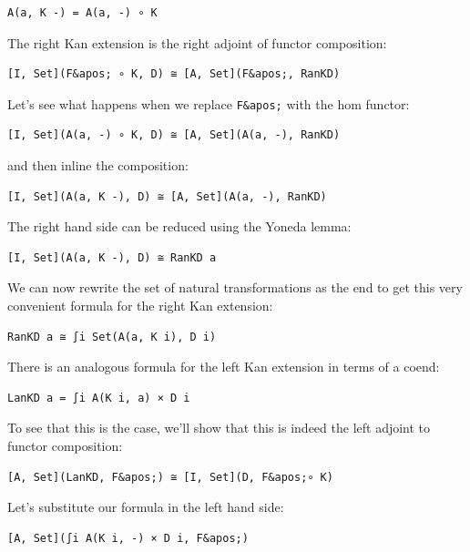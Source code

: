 \begin{verbatim}
A(a, K -) = A(a, -) ∘ K
\end{verbatim}

The right Kan extension is the right adjoint of functor composition:

\begin{verbatim}
[I, Set](F&apos; ∘ K, D) ≅ [A, Set](F&apos;, RanKD)
\end{verbatim}

Let's see what happens when we replace \texttt{F\&apos;} with the hom
functor:

\begin{verbatim}
[I, Set](A(a, -) ∘ K, D) ≅ [A, Set](A(a, -), RanKD)
\end{verbatim}

and then inline the composition:

\begin{verbatim}
[I, Set](A(a, K -), D) ≅ [A, Set](A(a, -), RanKD)
\end{verbatim}

The right hand side can be reduced using the Yoneda lemma:

\begin{verbatim}
[I, Set](A(a, K -), D) ≅ RanKD a
\end{verbatim}

We can now rewrite the set of natural transformations as the end to get
this very convenient formula for the right Kan extension:

\begin{verbatim}
RanKD a ≅ ∫i Set(A(a, K i), D i)
\end{verbatim}

There is an analogous formula for the left Kan extension in terms of a
coend:

\begin{verbatim}
LanKD a = ∫i A(K i, a) × D i
\end{verbatim}

To see that this is the case, we'll show that this is indeed the left
adjoint to functor composition:

\begin{verbatim}
[A, Set](LanKD, F&apos;) ≅ [I, Set](D, F&apos;∘ K)
\end{verbatim}

Let's substitute our formula in the left hand side:

\begin{verbatim}
[A, Set](∫i A(K i, -) × D i, F&apos;)
\end{verbatim}


